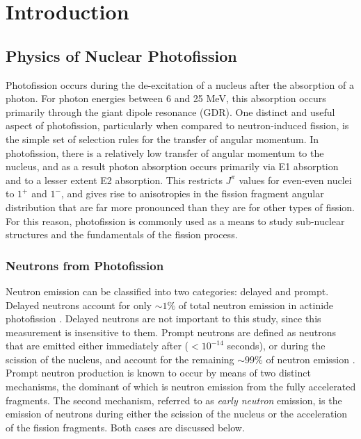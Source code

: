 \chapter{Introduction}
\section{Physics of Nuclear Photofission}
Photofission occurs during the de-excitation of a nucleus after the absorption of a photon. For photon energies between 6 and 25 MeV, this absorption occurs primarily through the giant dipole resonance (GDR). One distinct and useful aspect of photofission, particularly when compared to neutron-induced fission, is the simple set of selection rules for the transfer of angular momentum. In photofission, there is a relatively low transfer of angular momentum to the nucleus, and as a result photon absorption occurs primarily via E1 absorption and to a lesser extent E2 absorption. This restricts $J^{\pi}$ values for even-even nuclei to $1^{+}$ and $1^{-}$, and gives rise to anisotropies in the fission fragment angular distribution that are far more pronounced than they are for other types of fission. For this reason, photofission is commonly used as a means to study sub-nuclear structures and the fundamentals of the fission process. 

\subsection{Neutrons from Photofission}
Neutron emission can be classified into two categories: delayed and prompt. Delayed neutrons account for only $\sim1\%$ of total neutron emission in actinide photofission  \cite{Caldwell2017DelayedNs}. Delayed neutrons are not important to this study, since this measurement is insensitive to them. Prompt neutrons are defined as neutrons that are emitted either immediately after ($<10^{-14}$ seconds), or during the scission of the nucleus, and account for the remaining $\sim99\%$ of neutron emission \cite{Caldwell2017DelayedNs}. Prompt neutron production is known to occur by means of two distinct mechanisms, the dominant of which is neutron emission from the fully accelerated fragments. The second mechanism, referred to as \textit{early neutron} emission, is the emission of neutrons during either the scission of the nucleus or the acceleration of the fission fragments. Both cases are discussed below. 

